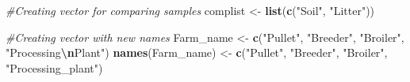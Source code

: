 \documentclass[
]{article}
\newenvironment{Shaded}{\begin{snugshade}}{\end{snugshade}}
\newcommand{\CommentTok}[1]{\textcolor[rgb]{0.56,0.35,0.01}{\textit{#1}}}
\newcommand{\FunctionTok}[1]{\textcolor[rgb]{0.13,0.29,0.53}{\textbf{#1}}}
\newcommand{\NormalTok}[1]{#1}
\newcommand{\OtherTok}[1]{\textcolor[rgb]{0.56,0.35,0.01}{#1}}
\newcommand{\SpecialCharTok}[1]{\textcolor[rgb]{0.81,0.36,0.00}{\textbf{#1}}}
\newcommand{\StringTok}[1]{\textcolor[rgb]{0.31,0.60,0.02}{#1}}
\begin{document}
\begin{Shaded}
\begin{Highlighting}[]
\CommentTok{\#Creating vector for comparing samples}
\NormalTok{ complist }\OtherTok{\textless{}{-}} \FunctionTok{list}\NormalTok{(}\FunctionTok{c}\NormalTok{(}\StringTok{"Soil"}\NormalTok{, }\StringTok{"Litter"}\NormalTok{))}

\CommentTok{\#Creating vector with new names}
\NormalTok{ Farm\_name }\OtherTok{\textless{}{-}} \FunctionTok{c}\NormalTok{(}\StringTok{"Pullet"}\NormalTok{, }\StringTok{"Breeder"}\NormalTok{, }\StringTok{"Broiler"}\NormalTok{, }\StringTok{"Processing}\SpecialCharTok{\textbackslash{}n}\StringTok{Plant"}\NormalTok{)}
\FunctionTok{names}\NormalTok{(Farm\_name) }\OtherTok{\textless{}{-}} \FunctionTok{c}\NormalTok{(}\StringTok{"Pullet"}\NormalTok{, }\StringTok{"Breeder"}\NormalTok{, }\StringTok{"Broiler"}\NormalTok{, }\StringTok{"Processing\_plant"}\NormalTok{)}


\end{Highlighting}
\end{Shaded}
\end{document}
